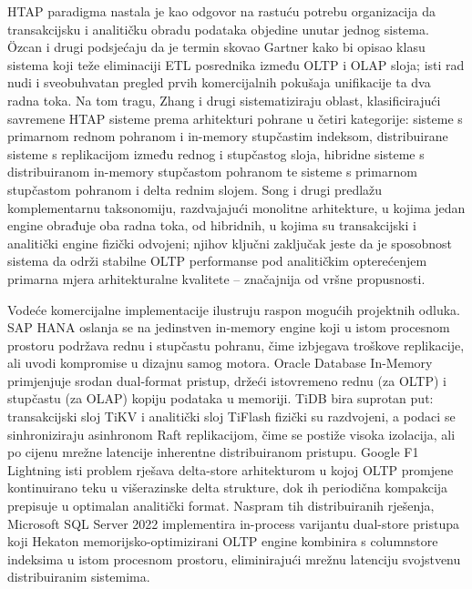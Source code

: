 HTAP paradigma nastala je kao odgovor na rastuću potrebu organizacija da transakcijsku i analitičku obradu podataka objedine unutar jednog sistema. Özcan i drugi \cite{ozcan2017htap} podsjećaju da je termin skovao Gartner kako bi opisao klasu sistema koji teže eliminaciji ETL posrednika između OLTP i OLAP sloja; isti rad nudi i sveobuhvatan pregled prvih komercijalnih pokušaja unifikacije ta dva radna toka. Na tom tragu, Zhang i drugi \cite{zhang2024htap} sistematiziraju oblast, klasificirajući savremene HTAP sisteme prema arhitekturi pohrane u četiri kategorije: sisteme s primarnom rednom pohranom i in-memory stupčastim indeksom, distribuirane sisteme s replikacijom između rednog i stupčastog sloja, hibridne sisteme s distribuiranom in-memory stupčastom pohranom te sisteme s primarnom stupčastom pohranom i delta rednim slojem. Song i drugi \cite{song2024survey} predlažu komplementarnu taksonomiju, razdvajajući monolitne arhitekture, u kojima jedan engine obrađuje oba radna toka, od hibridnih, u kojima su transakcijski i analitički engine fizički odvojeni; njihov ključni zaključak jeste da je sposobnost sistema da održi stabilne OLTP performanse pod analitičkim opterećenjem primarna mjera arhitekturalne kvalitete -- značajnija od vršne propusnosti.

Vodeće komercijalne implementacije ilustruju raspon mogućih projektnih odluka. SAP HANA \cite{farber2012hana} oslanja se na jedinstven in-memory engine koji u istom procesnom prostoru podržava rednu i stupčastu pohranu, čime izbjegava troškove replikacije, ali uvodi kompromise u dizajnu samog motora. Oracle Database In-Memory \cite{lahiri2015oracle} primjenjuje srodan dual-format pristup, držeći istovremeno rednu (za OLTP) i stupčastu (za OLAP) kopiju podataka u memoriji. TiDB \cite{huang2020tidb} bira suprotan put: transakcijski sloj TiKV i analitički sloj TiFlash fizički su razdvojeni, a podaci se sinhroniziraju asinhronom Raft replikacijom, čime se postiže visoka izolacija, ali po cijenu mrežne latencije inherentne distribuiranom pristupu. Google F1 Lightning \cite{yang2020f1} isti problem rješava delta-store arhitekturom u kojoj OLTP promjene kontinuirano teku u višerazinske delta strukture, dok ih periodična kompakcija prepisuje u optimalan analitički format. Naspram tih distribuiranih rješenja, Microsoft SQL Server 2022 implementira in-process varijantu dual-store pristupa koji Hekaton memorijsko-optimizirani OLTP engine kombinira s columnstore indeksima u istom procesnom prostoru, eliminirajući mrežnu latenciju svojstvenu distribuiranim sistemima.

